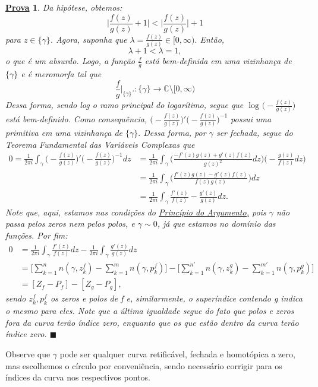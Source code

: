 \documentclass{article}
\newtheorem*{proof*}{\underline{Prova}}
\renewcommand\qedsymbol{$\blacksquare$}
\begin{document}
  \begin{proof*}
    Da hipótese, obtemos:
    \[
      \biggl\vert \frac{f(z)}{g(z)} + 1 \biggr\vert < \biggl\vert \frac{f(z)}{g(z)} \biggr\vert + 1
    \]
    para \(z\in \{\gamma \}\). Agora, suponha que \(\lambda = \frac{f(z)}{g(z)}\in [0, \infty).\) Então, 
    \[
      \lambda + 1 < \lambda  = 1,
    \]
    o que é um absurdo. Logo, a função \(\frac{f}{g}\) está bem-definida em uma vizinhança de \(\{\gamma \}\) e é meromorfa tal que 
    \[
      \frac{f}{g}\biggl|_{\{\gamma \}}\biggr.:\{\gamma \}\rightarrow \mathbb{C}\setminus{[0, \infty)}
    \]
    Dessa forma, sendo log o ramo principal do logarítimo, segue que \(\log^{}{\biggl(-\frac{f(z)}{g(z)}\biggr)}\) está bem-definido. Como consequência,
    \(\biggl(-\frac{f(z)}{g(z)}\biggr)'\biggl(-\frac{f(z)}{g(z)}\biggr)^{-1}\) possui uma primitiva em uma vizinhança de \(\{\gamma \}.\) Dessa forma, por \(\gamma \)
    ser fechada, segue do Teorema Fundamental das Variáveis Complexas que 
    \begin{align*}
      0 = \frac{1}{2\pi i}\int_{\gamma }^{}\biggl(-\frac{f(z)}{g(z)}\biggr)'\biggl(-\frac{f(z)}{g(z)}\biggr)^{-1}dz &= \frac{1}{2\pi i}\int_{\gamma }^{}\biggl(\frac{-f'(z)g(z) + g'(z)f(z)}{g(z)^{2}}dz\biggr)\biggl(-\frac{g(z)}{f(z)}dz\biggr)\\
                                                                                                                    &= \frac{1}{2\pi i}\int_{\gamma }^{}\biggl(\frac{f'(z)g(z) - g'(z)f(z)}{f(z)g(z)}\biggr)dz\\
                                                                                                                    &= \frac{1}{2\pi i}\int_{\gamma }^{}\frac{f'(z)}{f(z)} - \frac{g'(z)}{g(z)}dz.
    \end{align*}
    Note que, aqui, estamos nas condições do \hyperlink{argument-principle}{Princípio do Argumento,} pois \(\gamma \) não passa pelos zeros nem pelos polos, e \(\gamma \sim 0\), já que estamos no domínio das funções. Por fim:
    \begin{align*}
      0 &= \frac{1}{2\pi i}\int_{\gamma }^{}\frac{f'(z)}{f(z)}dz - \frac{1}{2\pi i}\int_{\gamma }^{}\frac{g'(z)}{g(z)}dz\\
        &= \biggl[\sum\limits_{k=1}^{n}n(\gamma , z_{k}^{f}) - \sum\limits_{k=1}^{m}n(\gamma , p_{k}^{f})\biggr] - \biggl[\sum\limits_{k=1}^{n'}n(\gamma , z_{k}^{g}) - \sum\limits_{k=1}^{m'}n(\gamma , p_{k}^{g})\biggr]\\
        &= [Z_{f} - P_{f}] - [Z_{g} - P_{g}],
    \end{align*}
    sendo \(z_{k}^{f}, p_{k}^{f}\) os zeros e polos de f e, similarmente, o superíndice contendo g indica o mesmo para eles. Note que a última igualdade segue do fato que polos e zeros fora da curva terão índice zero, enquanto
    que os que estão dentro da curva terão índice zero. \qedsymbol
  \end{proof*}
  Observe que \(\gamma \) pode ser qualquer curva retificável, fechada e homotópica a zero, mas escolhemos o círculo por conveniência, sendo necessário
  corrigir para os índices da curva nos respectivos pontos.
\end{document}
